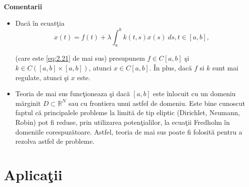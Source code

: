 \documentclass[a4paper,12pt,oneside]{report}
\begin{document}
\textbf{Comentarii}
\begin{itemize}

\item Dac\u{a} \^{i}n ecuat\c{t}ia \begin{displaymath} x\left ( t \right ) = f\left ( t  \right ) + \lambda \int_{a}^{b}k\left ( t,s \right )x\left ( s \right )\ ds, t \in \left [ a,b \right ], \end{displaymath}

\noindent (care este \ref{eq:2.21} de mai sus) presupunem \(f\in C\left [ a,b \right ]\) \c{s}i \(k\in  C\left (\left [ a,b \right ] \times \left [ a,b \right ] \right )\), atunci \(x\in C\left [ a,b \right ]\). \^{I}n plus, dac\u{a} \(f\) si \(k\) sunt mai regulate, atunci \c{s}i \(x\) este.
        		      		      		
\item Teoria de mai sus func\c{t}ioneaza \c{s}i dac\u{a} \(\left [ a,b \right ]\) este \^{i}nlocuit cu un domeniu m\u{a}rginit \(D\subset \mathbb{R}^{N}\) sau cu frontiera unui astfel de domeniu. Este bine cunoscut faptul c\u{a} principalele probleme la limit\u{a} de tip eliptic (Dirichlet, Neumann, Robin) pot fi reduse, prin utilizarea poten\c{t}ialilor, la ecua\c{t}ii Fredholm \^{i}n domeniile corespuz\u{a}toare. Astfel, teoria de mai sus poate fi folosit\u{a} pentru a rezolva astfel de probleme.
        		      		      		
\end{itemize}



\chapter{Aplica\c{t}ii}
\nocite{sburlan}
\nocite{silov}
\end{document}
